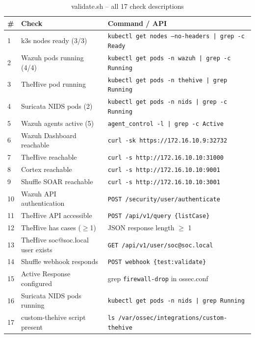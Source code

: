 \documentclass[12pt,a4paper]{report}
\begin{document}
\begin{table}[H]
\centering
\caption{validate.sh -- all 17 check descriptions}
\begin{tabularx}{\textwidth}{lXl}
\toprule
\textbf{\#} & \textbf{Check} & \textbf{Command / API} \\
\midrule
1  & k3s nodes ready (3/3)              & \texttt{kubectl get nodes --no-headers | grep -c Ready} \\
2  & Wazuh pods running (4/4)           & \texttt{kubectl get pods -n wazuh | grep -c Running} \\
3  & TheHive pod running                & \texttt{kubectl get pods -n thehive | grep Running} \\
4  & Suricata NIDS pods (2)             & \texttt{kubectl get pods -n nids | grep -c Running} \\
5  & Wazuh agents active (5)            & \texttt{agent\_control -l | grep -c Active} \\
6  & Wazuh Dashboard reachable          & \texttt{curl -sk https://172.16.10.9:32732} \\
7  & TheHive reachable                  & \texttt{curl -s http://172.16.10.10:31000} \\
8  & Cortex reachable                   & \texttt{curl -s http://172.16.10.10:9001} \\
9  & Shuffle SOAR reachable             & \texttt{curl -s http://172.16.10.10:3001} \\
10 & Wazuh API authentication           & \texttt{POST /security/user/authenticate} \\
11 & TheHive API accessible             & \texttt{POST /api/v1/query \{listCase\}} \\
12 & TheHive has cases ($\geq$1)        & JSON response length $\geq$ 1 \\
13 & TheHive soc@soc.local user exists  & \texttt{GET /api/v1/user/soc@soc.local} \\
14 & Shuffle webhook responds           & \texttt{POST webhook \{test:validate\}} \\
15 & Active Response configured         & grep \texttt{firewall-drop} in ossec.conf \\
16 & Suricata NIDS pods running         & \texttt{kubectl get pods -n nids | grep Running} \\
17 & custom-thehive script present      & \texttt{ls /var/ossec/integrations/custom-thehive} \\
\bottomrule
\end{tabularx}
\label{tab:checks}
\end{table}
\end{document}
